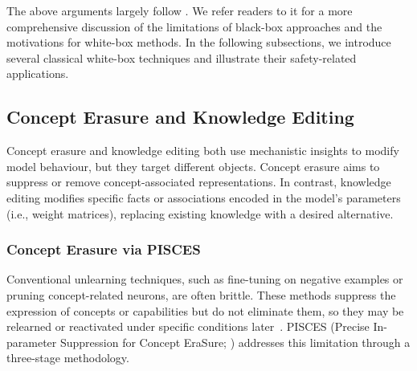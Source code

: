 The above arguments largely follow . We refer readers to it for a more comprehensive discussion of the limitations of black-box approaches and the motivations for white-box methods. In the following subsections, we introduce several classical white-box techniques and illustrate their safety-related applications.

\subsection{Concept Erasure and Knowledge Editing}
Concept erasure and knowledge editing both use mechanistic insights to modify model behaviour, but they target different objects. Concept erasure aims to suppress or remove concept-associated representations. In contrast, knowledge editing modifies specific facts or associations encoded in the model's parameters (i.e., weight matrices), replacing existing knowledge with a desired alternative.

\subsubsection{Concept Erasure via PISCES}
Conventional unlearning techniques, such as fine-tuning on negative examples or pruning concept-related neurons, are often brittle. These methods suppress the expression of concepts or capabilities but do not eliminate them, so they may be relearned or reactivated under specific conditions later~. PISCES (Precise In-parameter Suppression for Concept EraSure; ) addresses this limitation through a three-stage methodology.

